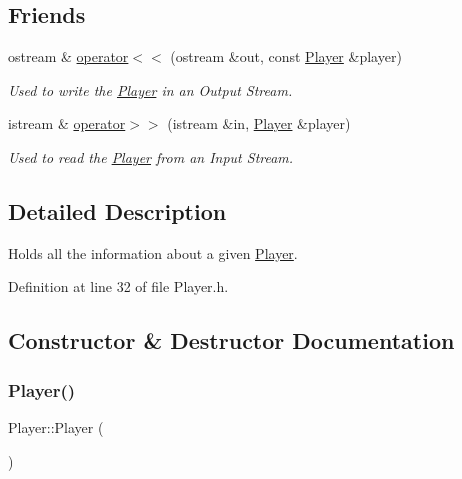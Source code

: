 \subsection*{Friends}
\begin{DoxyCompactItemize}
\item 
ostream \& \hyperlink{class_player_a7429373489b5ccfffc0c6f7d3b237b06}{operator$<$$<$} (ostream \&out, const \hyperlink{class_player}{Player} \&player)
\begin{DoxyCompactList}\small\item\em Used to write the \hyperlink{class_player}{Player} in an Output Stream. \end{DoxyCompactList}\item 
istream \& \hyperlink{class_player_ac80a9cf20cbee01df8046ca9497b0b2d}{operator$>$$>$} (istream \&in, \hyperlink{class_player}{Player} \&player)
\begin{DoxyCompactList}\small\item\em Used to read the \hyperlink{class_player}{Player} from an Input Stream. \end{DoxyCompactList}\end{DoxyCompactItemize}


\subsection{Detailed Description}
Holds all the information about a given \hyperlink{class_player}{Player}. 

Definition at line 32 of file Player.\+h.



\subsection{Constructor \& Destructor Documentation}
\hypertarget{class_player_affe0cc3cb714f6deb4e62f0c0d3f1fd8}{}\label{class_player_affe0cc3cb714f6deb4e62f0c0d3f1fd8} 
\subsubsection{\texorpdfstring{Player()}{Player()}\hspace{0.1cm}{\footnotesize\ttfamily [1/3]}}
{\footnotesize\ttfamily Player\+::\+Player (\begin{DoxyParamCaption}{ }\end{DoxyParamCaption})\hspace{0.3cm}{\ttfamily [inline]}}



